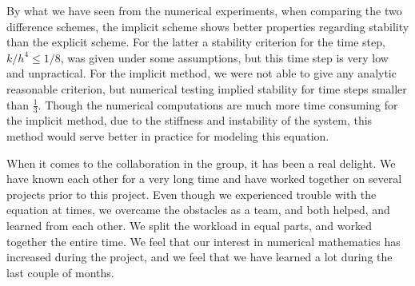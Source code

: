 By what we have seen from the numerical experiments, when comparing the two difference schemes, the implicit scheme shows better properties regarding stability than the explicit scheme. For the latter a stability criterion for the time step, $k/h^4 \le 1/8$, was given under some assumptions, but this time step is very low and unpractical. For the implicit method, we were not able to give any analytic reasonable criterion, but numerical testing implied stability for time steps smaller than $\frac{1}{3}$. Though the numerical computations are much more time consuming for the implicit method, due to the stiffness and instability of the system, this method would serve better in practice for modeling this equation.

When it comes to the collaboration in the group, it has been a real delight. We have known each other for a very long time and have worked together on several projects prior to this project. Even though we experienced trouble with the equation at times, we overcame the obstacles as a team, and both helped, and learned from each other. We split the workload in equal parts, and worked together the entire time. We feel that our interest in numerical mathematics has increased during the project, and we feel that we have learned a lot during the last couple of months.